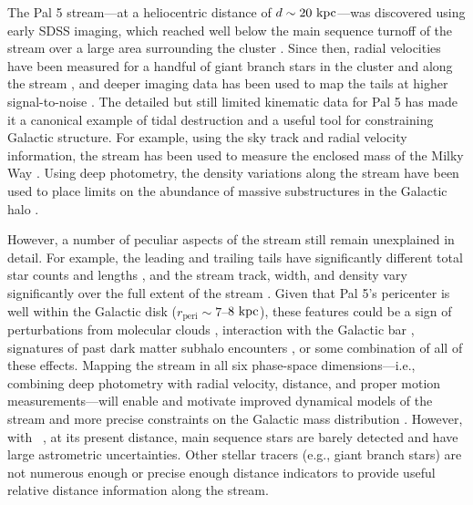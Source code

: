 \documentclass[twocolumn]{aastex63}
\begin{document}
The Pal 5 stream---at a heliocentric distance of $d \sim 20~\mathrm{kpc}$---was discovered using early SDSS imaging, which reached well below the main sequence turnoff of the stream over a large area surrounding the cluster \citep{Odenkirchen:2001, Rockosi:2002}.
Since then, radial velocities have been measured for a handful of giant branch stars in the cluster and along the stream \citep{Odenkirchen:2002, Odenkirchen:2009, Ibata:2017}, and deeper imaging data has been used to map the tails at higher signal-to-noise \citep{Bernard:2016, Ibata:2016, Bonaca:2019}.
The detailed but still limited kinematic data for Pal 5 has made it a canonical example of tidal destruction and a useful tool for constraining Galactic structure.
For example, using the sky track and radial velocity information, the stream has been used to measure the enclosed mass of the Milky Way \citep{Kuepper:2015, Bovy:2016}.
Using deep photometry, the density variations along the stream have been used to place limits on the abundance of massive substructures in the Galactic halo \citep{Erkal:2017}.

However, a number of peculiar aspects of the stream still remain unexplained in detail.
For example, the leading and trailing tails have significantly different total star counts and lengths \citep[both different by a factor of $\sim$2 between leading and trailing;][]{Dehnen:2004, Bernard:2016}, and the stream track, width, and density vary significantly over the full extent of the stream \citep{Ibata:2016, Bonaca:2019}.
Given that Pal 5's pericenter is well within the Galactic disk ($r_{\textrm{peri}} \sim 7$--$8~\mathrm{kpc}$),
these features could be a sign of perturbations from molecular clouds \citep[e.g.,][]{Amorisco:2016}, interaction with the Galactic bar \citep[e.g.,][]{Pearson:2017}, signatures of past dark matter subhalo encounters \citep[e.g.,][]{Erkal:2017}, or some combination of all of these effects.
Mapping the stream in all six phase-space dimensions---i.e., combining deep photometry with radial velocity, distance, and proper motion measurements---will enable and motivate improved dynamical models of the stream and more precise constraints on the Galactic mass distribution \citep[e.g.,][]{PriceWhelan:2013}.
However, with \Gaia\ , at its present distance, main sequence stars are barely detected and have large astrometric uncertainties.
Other stellar tracers (e.g., giant branch stars) are not numerous enough or precise enough distance indicators to provide useful relative distance information along the stream.
\end{document}
